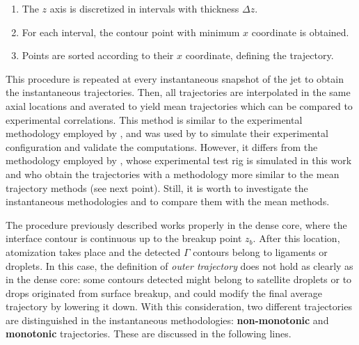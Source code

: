 \begin{enumerate}

	\item The $z$ axis is discretized in intervals with thickness $\Delta z$. 
	
	\item For each interval, the contour point with minimum $x$ coordinate is obtained.
	
	\item Points are sorted according to their $x$ coordinate, defining the trajectory.

\end{enumerate}

This procedure is repeated at every instantaneous snapshot of the jet to obtain the instantaneous trajectories. Then, all  trajectories are interpolated in the same axial locations and averated to yield mean trajectories which can be compared to experimental correlations. This method is similar to the experimental methodology employed by , and was used by  to simulate their experimental configuration and validate the computations. However, it differs from the methodology employed by , whose experimental test rig is simulated in this work and who obtain the trajectories with a methodology more similar to the mean trajectory methods (see next point). Still, it is worth to investigate the instantaneous methodologies and to compare them with the mean methods.

The procedure previously described works properly in the dense core, where the interface contour is continuous up to the breakup point $z_b$. After this location, atomization takes place and the detected $\Gamma$ contours belong to ligaments or droplets. In this case, the definition of \textsl{outer trajectory} does not hold as clearly as in the dense core: some contours detected might belong to satellite droplets or to drops originated from surface breakup, and could modify the final average trajectory by lowering it down. With this consideration, two different trajectories are distinguished in the instantaneous methodologies: \textbf{non-monotonic} and \textbf{monotonic} trajectories. These are discussed in the following lines.


